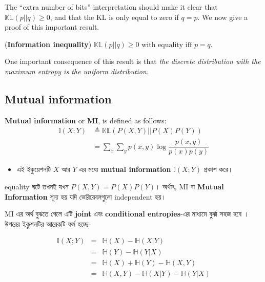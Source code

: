 \documentclass[graybox, envcountchap, twocolumn]{styles/svmult}
\begin{document}
{The “extra number of bits” interpretation should make it clear that $\mathbb{KL}(p||q) \geq 0$, and that the KL is only equal to zero if $q = p$. We now give a proof of this important result.

\begin{theorem}
(\textbf{Information inequality}) $\mathbb{KL}(p||q) \geq 0 \text{ with equality iff } p=q$.
\end{theorem}

One important consequence of this result is that \emph{the discrete distribution with the maximum
entropy is the uniform distribution}.


\subsection{Mutual information}
\label{sec:Mutual-information}
\begin{definition}
\textbf{Mutual information} or \textbf{MI}, is defined as follows:
\begin{equation}\begin{split}
\mathbb{I}(X;Y) & \triangleq \mathbb{KL}(P(X,Y)||P(X)P(Y)) \\
    & =\sum\limits_x\sum\limits_yp(x,y)\log\dfrac{p(x,y)}{p(x)p(y)}
\end{split}\end{equation}



\begin{itemize}
    \item {\bengalifont এই ইকুয়েশনটি $X$ আর $Y$ এর মধ্যে {\bf mutual information} $\mathbb{I}(X;Y)$ প্রকাশ করে।}
    
\end{itemize}

{\bengalifont equality ঘটে তখনই যখন $P(X,Y)=P(X)P(Y)$। অর্থাৎ, MI বা \textbf{Mutual Information} শূন্য হয় যদি ভেরিয়েবলগুলো independent হয়।}
\end{definition}

{\bengalifont MI এর অর্থ বুঝতে গেলে এটি \textbf{joint} এবং \textbf{conditional entropies}-এর মাধ্যমে বুঝা সহজ হবে । উপরের ইকুশনটির আরেকটি ফর্ম হচ্ছে- }




\begin{eqnarray}
\mathbb{I}(X;Y)&=&\mathbb{H}(X)-\mathbb{H}(X|Y)\\
               &=&\mathbb{H}(Y)-\mathbb{H}(Y|X)\\
               &=&\mathbb{H}(X)+\mathbb{H}(Y)-\mathbb{H}(X,Y)\\
               &=&\mathbb{H}(X,Y)-\mathbb{H}(X|Y)-\mathbb{H}(Y|X)
\end{eqnarray}


}
\end{document}

